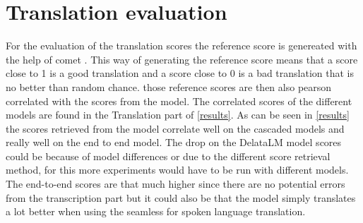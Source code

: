 \section{Translation evaluation}
For the evaluation of the translation scores the reference score is genereated with the help of comet \cite{rei-etal-2020-comet}. This way of generating the reference score means that a score close to 1 is a good translation and a score close to 0 is a bad translation that is no better than random chance.
those reference scores are then also pearson correlated with the scores from the model. The correlated scores of the different models are found in the Translation part of \autoref{results}. 
As can be seen in \autoref{results} the scores retrieved from the model correlate well on the cascaded models and really well on the end to end model. The drop on the DelataLM model scores could be because of model differences or due to the different score retrieval method, for this more experiments would have to be run with different models. The end-to-end scores are that much higher since there are no potential errors from the transcription part but it could also be that the model simply translates a lot better when using the seamless for spoken language translation. 

